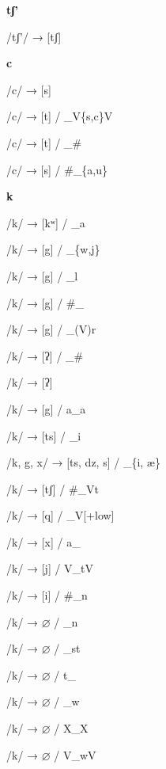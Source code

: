 \begin{center}\textbf{tʃ'}\end{center}
\begin{multicols}{4}
\noindent /tʃ'/ → [tʃ]

\end{multicols}

\begin{center}\textbf{c}\end{center}
\begin{multicols}{4}
\noindent /c/ → [s]

\noindent /c/ → [t] / \_V\{s,c\}V

\noindent /c/ → [t] / \_\#

\noindent /c/ → [s] / \#\_\{a,u\}
\end{multicols}

\begin{center}\textbf{k}\end{center}
\begin{multicols}{4}
\noindent /k/ → [kʷ] / \_a

\noindent /k/ → [g] / \_\{w,j\}

\noindent /k/ → [g] / \_l

\noindent /k/ → [g] / \#\_

\noindent /k/ → [g] / \_(V)r

\noindent /k/ → [ʔ] / \_\#

\noindent /k/ → [ʔ]

\noindent /k/ → [g] / a\_a

\noindent /k/ → [ts] / \_i

\noindent /k, g, x/ → [ts, dz, s] / \_\{i, æ\}

\noindent /k/ → [tʃ] / \#\_Vt

\noindent /k/ → [q] / \_V[+low]

\noindent /k/ → [x] / a\_

\noindent /k/ → [j] / V\_tV

\noindent /k/ → [i] / \#\_n

\noindent /k/ → $\varnothing$ / \_n

\noindent /k/ → $\varnothing$ / \_st

\noindent /k/ → $\varnothing$ / t\_

\noindent /k/ → $\varnothing$ / \_w

\noindent /k/ → $\varnothing$ / X\_X

\noindent /k/ → $\varnothing$ / V\_wV
\end{multicols}


